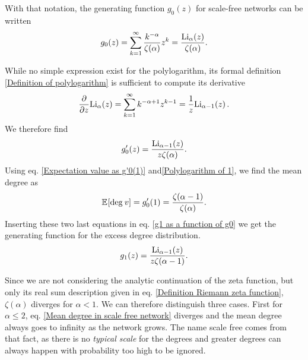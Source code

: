 \documentclass[
11pt, %
english, %
singlespacing, %
nolistspacing, %
liststotoc, %
headsepline, %
]{MastersDoctoralThesis} %
\begin{document}
With that notation, the generating function $g_0(z)$ for scale-free networks can be written
\begin{align}
	g_0(z) = \sum_{k=1}^\infty \frac{k^{-\alpha}}{\zeta(\alpha)} z^k = \frac{\mathrm{Li}_{\alpha}\!\left(z\right)}{\zeta(\alpha)}. \label{g0 for scale free networks}
\end{align}

While no simple expression exist for the polylogarithm, its formal definition \eqref{Definition of polylogarithm} is sufficient to compute its derivative
\begin{align}
	\frac{\partial}{\partial z} \mathrm{Li}_{\alpha}\!\left(z\right) = \sum_{k = 1}^\infty k^{-\alpha + 1} z^{k-1} = \frac{1}{z} \mathrm{Li}_{\alpha - 1}\!\left(z\right). \label{Derivative of the polylogarithm}
\end{align}
We therefore find
\begin{align}
	g'_0(z) = \frac{\mathrm{Li}_{\alpha - 1}\!\left(z\right)}{z \zeta(\alpha)}.  \label{Derivative of g0 for scale free networks}
\end{align}
Using eq. \eqref{Expectation value as g'0(1)} and\eqref{Polylogarithm of 1}, we find the mean degree as
\begin{align}
	\mathbb{E}_{}\!\left[ \mathrm{deg}_{}\, v \right] = g'_0(1) = \frac{\zeta(\alpha - 1)}{\zeta(\alpha)}. \label{Mean degree in scale free network}
\end{align}
Inserting these two last equations in eq. \eqref{g1 as a function of g0} we get the generating function for the excess degree distribution.
\begin{align}
	g_1(z) =  \frac{\mathrm{Li}_{\alpha - 1}\!\left(z\right)}{z \zeta(\alpha - 1)}. \label{g1 for scale free networks}
\end{align}

Since we are not considering the analytic continuation of the zeta function, but only its real sum description given in eq. \eqref{Definition Riemann zeta function}, $\zeta(\alpha)$ diverges for $\alpha < 1$. We can therefore distinguish three cases. First for $\alpha \leq 2$, eq. \eqref{Mean degree in scale free network} diverges and the mean degree always goes to infinity as the network grows. The name scale free comes from that fact, as there is no \emph{typical scale} for the degrees and greater degrees can always happen with probability too high to be ignored.
\end{document}
